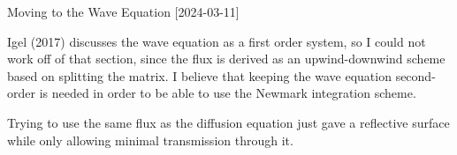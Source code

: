 \documentclass[12pt, letterpaper]{article}
\begin{document}
\begin{section}{Moving to the Wave Equation}
[2024-03-11]

Igel (2017)
discusses the wave equation as a first order system, so I could not work off of that section, since the flux is derived as an upwind-downwind scheme based on splitting the matrix. I believe that keeping the wave equation second-order is needed in order to be able to use the Newmark integration scheme.

Trying to use the same flux as the diffusion equation just gave a reflective surface while only allowing minimal transmission through it.

\bigskip


\end{section}
\end{document}
